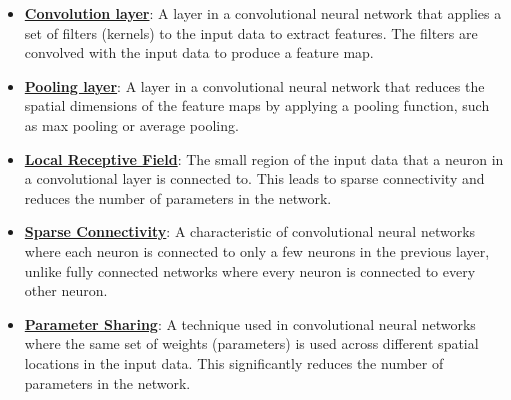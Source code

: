 \documentclass{article}%
\begin{document}
\begin{itemize}[leftmargin=*]
\item \href{https://purdue.brightspace.com/d2l/common/assets/pdfjs-d2l-dist/1.0.14-legacy/web/viewer.html?file=\%2Fcontent\%2Fenforced\%2F1095467-wl.202510.CS.24300.001\%2F09L1-cnn.pdf\%3Fou\%3D1095467\&lang=en-us\&container=d2l-fileviewer-rendered-pdf\&fullscreen=d2l-fileviewer-rendered-pdf-dialog\&height=667#page=6}{\textbf{Convolution layer}}: A layer in a convolutional neural network that applies a set of filters (kernels) to the input data to extract features. The filters are convolved with the input data to produce a feature map.%
\item \href{https://purdue.brightspace.com/d2l/common/assets/pdfjs-d2l-dist/1.0.14-legacy/web/viewer.html?file=\%2Fcontent\%2Fenforced\%2F1095467-wl.202510.CS.24300.001\%2F09L1-cnn.pdf\%3Fou\%3D1095467\&lang=en-us\&container=d2l-fileviewer-rendered-pdf\&fullscreen=d2l-fileviewer-rendered-pdf-dialog\&height=667#page=6}{\textbf{Pooling layer}}: A layer in a convolutional neural network that reduces the spatial dimensions of the feature maps by applying a pooling function, such as max pooling or average pooling.%
\item \href{https://purdue.brightspace.com/d2l/common/assets/pdfjs-d2l-dist/1.0.14-legacy/web/viewer.html?file=\%2Fcontent\%2Fenforced\%2F1095467-wl.202510.CS.24300.001\%2F09L1-cnn.pdf\%3Fou\%3D1095467\&lang=en-us\&container=d2l-fileviewer-rendered-pdf\&fullscreen=d2l-fileviewer-rendered-pdf-dialog\&height=667#page=10}{\textbf{Local Receptive Field}}: The small region of the input data that a neuron in a convolutional layer is connected to. This leads to sparse connectivity and reduces the number of parameters in the network.%
\item \href{https://purdue.brightspace.com/d2l/common/assets/pdfjs-d2l-dist/1.0.14-legacy/web/viewer.html?file=\%2Fcontent\%2Fenforced\%2F1095467-wl.202510.CS.24300.001\%2F09L1-cnn.pdf\%3Fou\%3D1095467\&lang=en-us\&container=d2l-fileviewer-rendered-pdf\&fullscreen=d2l-fileviewer-rendered-pdf-dialog\&height=667#page=10}{\textbf{Sparse Connectivity}}: A characteristic of convolutional neural networks where each neuron is connected to only a few neurons in the previous layer, unlike fully connected networks where every neuron is connected to every other neuron.%
\item \href{https://purdue.brightspace.com/d2l/common/assets/pdfjs-d2l-dist/1.0.14-legacy/web/viewer.html?file=\%2Fcontent\%2Fenforced\%2F1095467-wl.202510.CS.24300.001\%2F09L1-cnn.pdf\%3Fou\%3D1095467\&lang=en-us\&container=d2l-fileviewer-rendered-pdf\&fullscreen=d2l-fileviewer-rendered-pdf-dialog\&height=667#page=12}{\textbf{Parameter Sharing}}: A technique used in convolutional neural networks where the same set of weights (parameters) is used across different spatial locations in the input data. This significantly reduces the number of parameters in the network.%

\end{itemize}
\end{document}
